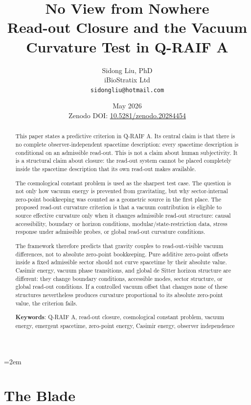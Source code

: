 \documentclass[12pt,a4paper]{article}
\title{%
  \textbf{No View from Nowhere}\\
  \large Read-out Closure and the Vacuum Curvature Test in Q-RAIF A%
}
\author{
  Sidong Liu, PhD \\
  \small iBioStratix Ltd \\
  \small \texttt{sidongliu@hotmail.com}
}
\date{May 2026\\
\small Zenodo DOI: \href{https://doi.org/10.5281/zenodo.20284454}{10.5281/zenodo.20284454}}
\theoremstyle{definition}
\theoremstyle{remark}
\begin{document}
\emergencystretch=2em
\raggedbottom
{}

\maketitle

\begin{abstract}
This paper states a predictive criterion in Q-RAIF A. Its central claim is that there is no complete observer-independent spacetime description: every spacetime description is conditional on an admissible read-out. This is not a claim about human subjectivity. It is a structural claim about closure: the read-out system cannot be placed completely inside the spacetime description that its own read-out makes available.

The cosmological constant problem is used as the sharpest test case. The question is not only how vacuum energy is prevented from gravitating, but why sector-internal zero-point bookkeeping was counted as a geometric source in the first place. The proposed read-out curvature criterion is that a vacuum contribution is eligible to source effective curvature only when it changes admissible read-out structure: causal accessibility, boundary or horizon conditions, modular/state-restriction data, stress response under admissible probes, or global read-out curvature conditions.

The framework therefore predicts that gravity couples to read-out-visible vacuum differences, not to absolute zero-point bookkeeping. Pure additive zero-point offsets inside a fixed admissible sector should not curve spacetime by their absolute value. Casimir energy, vacuum phase transitions, and global de Sitter horizon structure are different: they change boundary conditions, accessible modes, sector structure, or global read-out conditions. If a controlled vacuum offset that changes none of these structures nevertheless produces curvature proportional to its absolute zero-point value, the criterion fails.

\medskip
\noindent\textbf{Keywords}: Q-RAIF A, read-out closure, cosmological constant problem, vacuum energy, emergent spacetime, zero-point energy, Casimir energy, observer independence
\end{abstract}

\clearpage
\tableofcontents
\clearpage

\section{The Blade}
\label{sec:blade}
\end{document}
